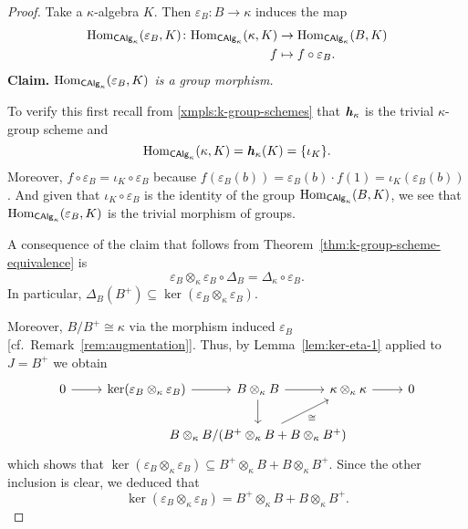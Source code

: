 \begin{proof}
    Take a $\kappa$-algebra $K$. Then $\varepsilon_B\colon B\to\kappa$ induces the map
    \begin{align*}
        {\rm Hom}_{\mathsf{CAlg}_\kappa}(\varepsilon_B,K)
            \colon{\rm Hom}_{\mathsf{CAlg}_\kappa}(\kappa,K)
            &\to{\rm Hom}_{\mathsf{CAlg}_\kappa}(B,K)\\
            f&\mapsto f\circ\varepsilon_B.
    \end{align*}
    \textbf{Claim.} \textit{${\rm Hom}_{\mathsf{CAlg}_\kappa}(\varepsilon_B,K)$ is a group morphism.}
    
    To verify this first recall from \ref{xmpls:k-group-schemes} that $\textrm{\boldmath$\mathit h$}_\kappa$ is the trivial $\kappa$-group scheme and
    $$
        {\rm Hom}_{\mathsf{CAlg}_\kappa}(\kappa,K)=\textrm{\boldmath$\mathit h$}_\kappa(K)=\{\iota_K\}.
    $$
    Moreover, $f\circ\varepsilon_B=\iota_K\circ\varepsilon_B$ because $f(\varepsilon_B(b))=\varepsilon_B(b)\cdot f(1)=\iota_K(\varepsilon_B(b))$. And given that $\iota_K\circ\varepsilon_B$ is the identity of the group ${\rm Hom}_{\mathsf{CAlg}_\kappa}(B,K)$, we see that ${\rm Hom}_{\mathsf{CAlg}_\kappa}(\varepsilon_B,K)$ is the trivial morphism of groups.

    A consequence of the claim that follows from Theorem~\ref{thm:k-group-scheme-equivalence} is
    $$
        \varepsilon_B\otimes_\kappa\varepsilon_B\circ\Delta_B = \Delta_\kappa\circ\varepsilon_B.
    $$
    In particular, $\Delta_B(B^+)\subseteq\ker(\varepsilon_B\otimes_\kappa\varepsilon_B)$.
    
    Moreover, $B/B^+\cong\kappa$ via the morphism induced $\varepsilon_B$ [cf.~Remark~\ref{rem:augmentation}]. Thus, by Lemma~\ref{lem:ker-eta-1} applied to $J=B^+$ we obtain
    \small
    $$
        \begin{tikzcd}
            0
                    \arrow[r]
                &\ker(\varepsilon_B\otimes_\kappa\varepsilon_B)
                    \arrow[r]
                &[-1.6cm]B\otimes_\kappa B
                    \arrow[r]
                        \arrow[d]
                &[-1.6cm]\kappa\otimes_\kappa\kappa\arrow[r]
                &0\\
                &&B\otimes_\kappa B/(B^+\otimes_\kappa B+B\otimes_\kappa B^+)
                    \arrow[ru,"\cong"']
        \end{tikzcd}
    $$
    \normalsize
    which shows that $\ker(\varepsilon_B\otimes_\kappa\varepsilon_B)\subseteq B^+\otimes_\kappa B + B\otimes_\kappa B^+$. Since the other inclusion is clear, we deduced that
    $$
        \ker(\varepsilon_B\otimes_\kappa\varepsilon_B)
            = B^+\otimes_\kappa B+B\otimes_\kappa B^+.
    $$
\end{proof}

